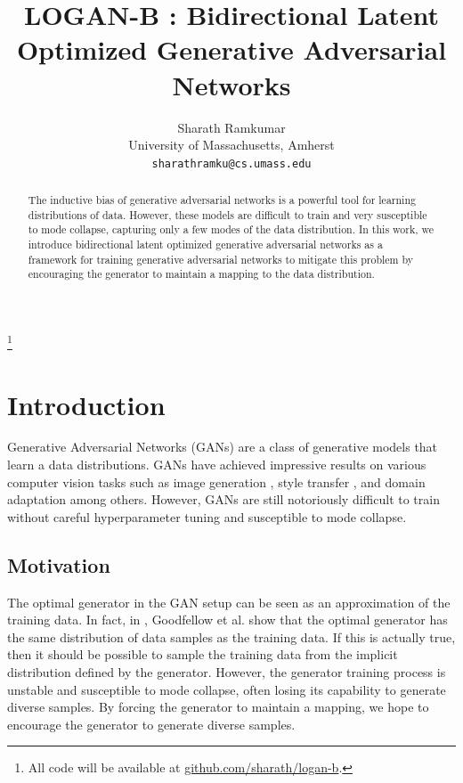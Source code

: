 \documentclass[10pt,twocolumn,letterpaper]{article}
\let\svthefootnote\thefootnote
\begin{document}
\title{LOGAN-B : Bidirectional Latent Optimized Generative Adversarial Networks}

\author{Sharath Ramkumar\\
University of Massachusetts, Amherst\\
{\tt\small sharathramku@cs.umass.edu}
} 

\maketitle

\begin{abstract}
    The inductive bias of generative adversarial networks is a powerful tool for learning distributions of data. However, these models are difficult to train and very susceptible to mode collapse, capturing only a few modes of the data distribution. In this work, we introduce bidirectional latent optimized generative adversarial networks as a framework for training generative adversarial networks to mitigate this problem by encouraging the generator to maintain a mapping to the data distribution.
\end{abstract}


\let\thefootnote\relax\footnote{All code will be available at \href{https://github.com/sharath/logan-b}{github.com/sharath/logan-b}.}
\addtocounter{footnote}{-1}\let\thefootnote\svthefootnote

\section{Introduction}

Generative Adversarial Networks (GANs) are a class of generative models that learn a data distributions. GANs have achieved impressive results on various computer vision tasks such as image generation \cite{karras2017progressive, brock2018large, karras2019analyzing}, style transfer \cite{zhu2017unpaired, zhu2017toward, isola2017image}, and domain adaptation \cite{tzeng2017adversarial, su2019active, sankaranarayanan2018generate} among others. However, GANs are still notoriously difficult to train without careful hyperparameter tuning and susceptible to mode collapse.

\subsection{Motivation}

The optimal generator in the GAN setup can be seen as an approximation of the training data. In fact, in \cite{goodfellow2014generative}, Goodfellow et al. show that the optimal generator has the same distribution of data samples as the training data. If this is actually true, then it should be possible to sample the training data from the implicit distribution defined by the generator. However, the generator training process is unstable and susceptible to mode collapse, often losing its capability to generate diverse samples. By forcing the generator to maintain a mapping, we hope to encourage the generator to generate diverse samples.
\end{document}

